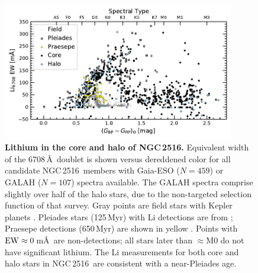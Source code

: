 \documentclass[12pt,twocolumn,tighten]{aastex63}
\newcommand{\cn}{NGC\,2516} %
\begin{document}
\begin{figure}[t]
	\begin{center}
		\leavevmode
			\includegraphics[width=0.9\textwidth]{f5a.pdf}
	\end{center}
	\vspace{-0.700cm}
  \caption{ {\bf Lithium in the core and halo of NGC\,2516.}
  Equivalent width of the 6708\,\AA\ doublet is shown versus
  dereddened color for all candidate \cn\ members with Gaia-ESO
  ($N=459$) or GALAH ($N=107$) spectra available.  The GALAH spectra
  comprise slightly over half of the halo stars, due to the
  non-targeted selection function of that survey.  Gray
  points are field stars with Kepler planets
  \citep{berger_identifying_2018}.  Pleiades stars (125\,Myr)
  with Li detections are from \citet{bouvier_pleiades_lirot_2018};
  Praesepe detections (650\,Myr) are shown in yellow
  \citep{soderblom_praesepe_1993}.  Points with ${\rm
  EW}\approx0\,$m\AA\ are non-detections; all stars 
  later than $\approx$M0 do not have significant lithium.
  The Li measurements for both core and halo stars in \cn\ are
  consistent with a near-Pleiades age.
  \label{fig:lithiumcorehalo}
  }
\end{figure}
\end{document}
